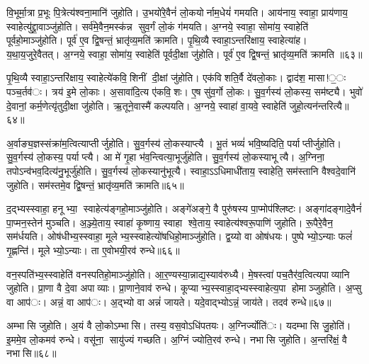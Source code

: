 वि॒भूर्मा॒त्रा प्र॒भूः पि॒त्रेत्य॑श्वना॒मानि॑ जुहोति। उ॒भयो॑रे॒वैनं॑ लो॒कयोर्नाम॒धेयं॑ गमयति। आय॑नाय॒ स्वाहा॒ प्राय॑णाय॒ स्वाहेत्यु॑द्द्रा॒वाञ्जु॑होति। सर्व॑मे॒वैन॒मस्क॑न्न सुव॒र्गं लो॒कं ग॑मयति। अ॒ग्नये॒ स्वाहा॒ सोमा॑य॒ स्वाहेति॑ पूर्वहो॒माञ्जु॑होति। पूर्व॑ ए॒व द्वि॒षन्तं॒ भ्रातृ॑व्य॒मति॑ क्रामति। पृ॒थि॒व्यै स्वाहा॒ऽन्तरि॑क्षाय॒ स्वाहेत्या॑ह। य॒था॒य॒जुरे॒वैतत्। अ॒ग्नये॒ स्वाहा॒ सोमा॑य॒ स्वाहेति॑ पूर्वदी॒क्षा जु॑होति। पूर्व॑ ए॒व द्वि॒षन्तं॒ भ्रातृ॑व्य॒मति॑ क्रामति ॥६३॥

पृ॒थि॒व्यै स्वाहा॒ऽन्तरि॑क्षाय॒ स्वाहेत्ये॑कवि॒शिनीं दी॒क्षां जु॑होति। एक॑विशति॒र्वै दे॑वलो॒काः। द्वाद॑श॒ मासा!॒ः पञ्च॒र्तव॑ः। त्रय॑ इ॒मे लो॒काः। अ॒सावा॑दि॒त्य ए॑कवि॒शः। ए॒ष सु॑व॒र्गो लो॒कः। सु॒व॒र्गस्य॑ लो॒कस्य॒ सम॑ष्ट्यै। भुवो॑ दे॒वानां॒ कर्म॒णेत्यृ॑तुदी॒क्षा जु॑होति। ऋ॒तूने॒वास्मै॑ कल्पयति। अ॒ग्नये॒ स्वाहा॑ वा॒यवे॒ स्वाहेति॑ जुहो॒त्यन॑न्तरित्यै॥६४॥

अ॒र्वाङ्य॒ज्ञस्संक्रा॑म॒त्वित्याप्तीर्जुहोति। सु॒व॒र्गस्य॑ लो॒कस्याप्त्यै। भू॒तं भव्यं॑ भवि॒ष्यदिति॒ पर्याप्तीर्जुहोति। सु॒व॒र्गस्य॑ लो॒कस्य॒ पर्याप्त्यै। आ मे॑ गृ॒हा भ॑व॒न्त्वित्या॒भूर्जु॑होति। सु॒व॒र्गस्य॑ लो॒कस्याभूत्यै। अ॒ग्निना॒ तपोऽन्व॑भव॒दित्य॑नु॒भूर्जु॑होति। सु॒व॒र्गस्य॑ लो॒कस्यानु॑भूत्यै। स्वाहा॒ऽऽधिमाधी॑ताय॒ स्वाहेति॒ सम॑स्तानि वैश्वदे॒वानि॑ जुहोति। सम॑स्तमे॒व द्वि॒षन्तं॒ भ्रातृ॑व्य॒मति॑ क्रामति॥६५॥

द॒द्भ्यस्स्वाहा॒ हनूभ्या॒ स्वाहेत्य॑ङ्गहो॒माञ्जु॑होति। अङ्गे॑अङ्गे॒ वै पुरु॑षस्य पा॒प्मोप॑श्लिष्टः। अङ्गा॑दङ्गादे॒वैनं॑ पा॒प्मन॒स्तेन॑ मुञ्चति। अ॒ञ्ज्ये॒ताय॒ स्वाहा॑ कृ॒ष्णाय॒ स्वाहा श्वे॒ताय॒ स्वाहेत्य॑श्वरू॒पाणि॑ जुहोति। रू॒पैरे॒वैन॒ सम॑र्धयति। ओष॑धीभ्य॒स्स्वाहा॒ मूलेभ्य॒स्स्वाहेत्यो॑षधिहो॒माञ्जु॑होति। द्व॒य्यो वा ओष॑धयः। पुष्पेभ्यो॒ऽन्याः फलं॑ गृ॒ह्णन्ति॑। मूलेभ्यो॒ऽन्याः। ता ए॒वोभयी॒रव॑ रुन्धे॥६६॥

वन॒स्पति॑भ्य॒स्स्वाहेति॑ वनस्पतिहो॒माञ्जु॑होति। आ॒र॒ण्यस्या॒न्नाद्य॒स्याव॑रुध्यै। मे॒षस्त्वा॑ पच॒तैर॑व॒त्वित्यपाव्यानि जुहोति। प्रा॒णा वै दे॒वा अपाव्याः। प्रा॒णाने॒वाव॑ रुन्धे। कूप्याभ्य॒स्स्वाहा॒द्भ्यस्स्वाहेत्य॒पा होमाञ्जुहोति। अ॒प्सु वा आप॑ः। अन्नं॒ वा आप॑ः। अ॒द्भ्यो वा अन्नं॑ जायते। यदे॒वाद्भ्योऽन्नं॒ जाय॑ते। तदव॑ रुन्धे॥६७॥


अम्भासि जुहोति। अ॒यं वै लो॒कोऽम्भासि। तस्य॒ वस॒वोऽधि॑पतयः। अ॒ग्निर्ज्योति॑ः। यदम्भासि जु॒होति॑। इ॒ममे॒व लो॒कमव॑ रुन्धे। वसू॑ना॒ सायु॑ज्यं गच्छति। अ॒ग्निं ज्योति॒रव॑ रुन्धे। नभासि जुहोति। अ॒न्तरि॑क्षं॒ वै नभासि॥६८॥

